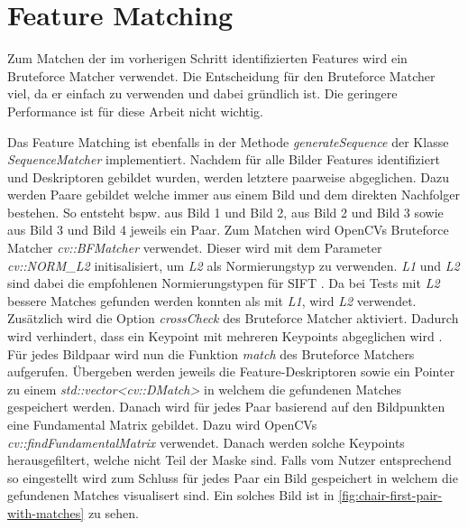 \section{Feature Matching}
Zum Matchen der im vorherigen Schritt identifizierten Features wird ein Bruteforce Matcher verwendet.
Die Entscheidung für den Bruteforce Matcher viel, da er einfach zu verwenden und dabei gründlich ist.
Die geringere Performance ist für diese Arbeit nicht wichtig.

Das Feature Matching ist ebenfalls in der Methode \emph{generateSequence} der Klasse \emph{SequenceMatcher} implementiert.
Nachdem für alle Bilder Features identifiziert und Deskriptoren gebildet wurden, werden letztere paarweise abgeglichen.
Dazu werden Paare gebildet welche immer aus einem Bild und dem direkten Nachfolger bestehen.
So entsteht bspw. aus Bild 1 und Bild 2, aus Bild 2 und Bild 3 sowie aus Bild 3 und Bild 4 jeweils ein Paar.
Zum Matchen wird OpenCVs Bruteforce Matcher \emph{cv::BFMatcher}\cite{opencv_doc_bfmatcher} verwendet.
Dieser wird mit dem Parameter \emph{cv::NORM\_L2} initisalisiert, um \emph{L2} als Normierungstyp zu verwenden.
\emph{L1} und \emph{L2} sind dabei die empfohlenen Normierungstypen für SIFT \cite{opencv_doc_bfmatcher_create}.
Da bei Tests mit \emph{L2} bessere Matches gefunden werden konnten als mit \emph{L1}, wird \emph{L2} verwendet.
Zusätzlich wird die Option \emph{crossCheck} des Bruteforce Matcher aktiviert.
Dadurch wird verhindert, dass ein Keypoint mit mehreren Keypoints abgeglichen wird \cite{opencv_doc_bfmatcher_create}.
Für jedes Bildpaar wird nun die Funktion \emph{match}\cite{opencv_doc_match} des Bruteforce Matchers aufgerufen.
Übergeben werden jeweils die Feature-Deskriptoren sowie ein Pointer zu einem \emph{std::vector<cv::DMatch>} in welchem die gefundenen Matches gespeichert werden.
Danach wird für jedes Paar basierend auf den Bildpunkten eine Fundamental Matrix gebildet.
Dazu wird OpenCVs \emph{cv::findFundamentalMatrix}\cite{opencv_doc_find_fundamental_mat} verwendet.
Danach werden solche Keypoints herausgefiltert, welche nicht Teil der Maske sind.
Falls vom Nutzer entsprechend so eingestellt wird zum Schluss für jedes Paar ein Bild gespeichert in welchem die gefundenen Matches visualisert sind.
Ein solches Bild ist in \autoref{fig:chair-first-pair-with-matches} zu sehen.